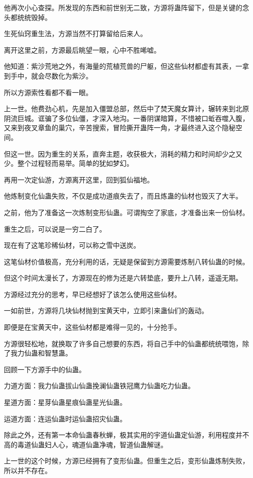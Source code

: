 \begin{this_body}
他再次小心查探。所发现的东西和前世别无二致，方源将蛊阵留下，但是关键的念头都统统毁掉。

生死仙窍重生法，方源当然不打算留给后来人。

离开这里之前，方源最后眺望一眼，心中不胜唏嘘。

他知道：紫沙荒地之外，有海量的荒植荒兽的尸躯，但这些仙材都虚有其表，一拿到手中，就会尽数化为紫沙。

所以方源索性看都不看一眼。

上一世。他费劲心机，先是加入僵盟总部，然后中了焚天魔女算计，辗转来到北原阴流巨城。诓骗了多位仙僵，才深入地沟。一番阴谋暗算，不惜被口蚯吞噬入腹，又来到夜叉章鱼的巢穴，辛苦搜索，冒险撕开蛊阵一角，才最终进入这个隐秘空间。

但这一世。因为重生的关系，直奔主题，收获极大，消耗的精力和时间却少之又少。整个过程轻而易举。简单的犹如梦幻。

再用一次定仙游，方源离开这里，回到狐仙福地。

他炼制变化仙蛊失败，不仅是成功道痕失去了，而且炼蛊的仙材也毁灭了大半。

之前，他为了准备这一次炼制变形仙蛊。可谓掏空了家底，才准备出来一份仙材。

重生之后，可以说是一穷二白了。

现在有了这笔珍稀仙材，可以称之雪中送炭。

这笔仙材价值极高，充分利用的话，无疑是保留到方源需要炼制八转仙蛊的时候。

但这个时间太漫长了，方源现在的修为还是六转垫底，要升上八转，遥遥无期。

方源经过充分的思考，早已经想好了该怎么使用这些仙材。

一如前世，方源将几块仙材抛到宝黄天中，立即引来蛊仙们的轰动。

即便是在宝黄天中，这些仙材都是难得一见的，十分抢手。

方源很轻松地，就换取了许多自己想要的东西，将自己手中的仙蛊都统统喂饱，除了我力仙蛊和智慧蛊。

回顾一下方源手中的仙蛊。

力道方面：我力仙蛊拔山仙蛊挽澜仙蛊铁冠鹰力仙蛊吃力仙蛊。

星道方面：星芽仙蛊星痕仙蛊星光仙蛊。

运道方面：连运仙蛊时运仙蛊招灾仙蛊。

除此之外，还有第一本命仙蛊春秋蝉，极其实用的宇道仙蛊定仙游，利用程度并不高的毒道仙蛊妇人心，魂道仙蛊净魂，智道仙蛊解谜。

上一世的这个时候，方源已经拥有了变形仙蛊。但重生之后，变形仙蛊炼制失败，所以并不存在。


\end{this_body}
